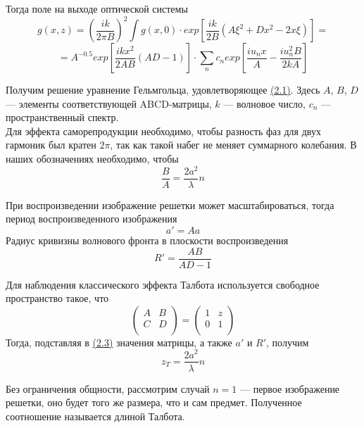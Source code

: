 Тогда поле на выходе оптической системы
\[
g(x, z) = \left(\dfrac{ik}{2\pi B}\right)^2\int g(x, 0) \cdot exp\left[\dfrac{ik}{2B}(A\xi^2 + Dx^2 - 2x\xi)\right] =
\]
\begin{equation}
\label{2}
=  A^{-0.5} exp\left[\dfrac{ikx^2}{2AB}(AD-1)\right]\cdot \sum\limits_n c_n exp\left[\dfrac{iu_nx}{A} - \dfrac{iu_n^2B}{2kA}\right]
\end{equation}

Получим решение уравнение Гельмгольца, удовлетворяющее \hyperref[1]{(2.1)}. Здесь $A$, $B$, $D$ --- элементы соответствующей ABCD-матрицы, $k$ --- волновое число, $c_n$ --- пространственный спектр.\\

Для эффекта саморепродукции необходимо, чтобы разность фаз для двух гармоник был кратен $2\pi$, так как такой набег не меняет суммарного колебания. В наших обозначениях необходимо, чтобы
\begin{equation}
\label{3}
    \dfrac{B}{A} = \dfrac{2a^2}{\lambda}n
\end{equation}

При воспроизведении изображение решетки может масштабироваться, тогда период воспроизведенного изображения
\begin{equation}
    a' = Aa
\end{equation}
Радиус кривизны волнового фронта в плоскости воспроизведения
\begin{equation}
    R' = \dfrac{AB}{AD - 1}
\end{equation}

Для наблюдения классического эффекта Талбота используется свободное пространство такое, что
\[
\begin{pmatrix}
    A & B\\
    C & D\\
\end{pmatrix} = \begin{pmatrix}
    1 & z\\
    0 & 1\\
\end{pmatrix}
\]
Тогда, подставляя в \hyperref[3]{(2.3)} значения матрицы, а также $a'$ и $R'$, получим
\begin{equation}
    z_T = \dfrac{2a^2}{\lambda}n
\end{equation}

Без ограничения общности, рассмотрим случай $n = 1$ --- первое изображение решетки, оно будет того же размера, что и сам предмет. Полученное соотношение называется длиной Талбота.\\




